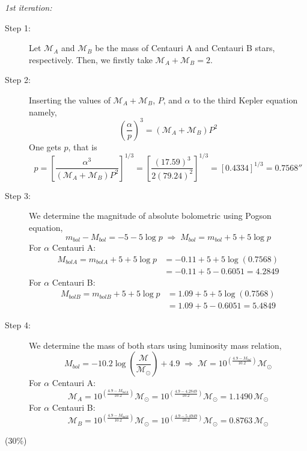 \begin{description}
  \emph{1st iteration:}
  \begin{description}
  \item[Step 1:] Let $\mathcal{M}_A$ and $\mathcal{M}_B$ be the mass of
    Centauri A and Centauri B stars, respectively. Then, we firstly take
    $\mathcal{M}_A + \mathcal{M}_B = 2$.
  \item[Step 2:] Inserting the values of $\mathcal{M}_A + \mathcal{M}_B$,
    $P$, and $\alpha$ to the third Kepler equation namely,
    \[ \left( \frac{\alpha}{p} \right)^3
       = (\mathcal{M}_A + \mathcal{M}_B) P^2 \]
    One gets $p$, that is
    \[ p = \left[ \frac{\alpha^3}{(\mathcal{M}_A + \mathcal{M}_B) P^2}
           \right]^{1/3}
         = \left[ \frac{(17.59)^3}{2 (79.24)^2} \right]^{1/3}
         = \left[ 0.4334 \right]^{1/3} = 0.7568'' \]
  \item[Step 3:] We determine the magnitude of absolute bolometric using
    Pogson equation,
    \[ m_{bol} - M_{bol} = -5 - 5\log p
       \;\Longrightarrow\; M_{bol} = m_{bol} + 5 + 5\log p \]
    For $\alpha$ Centauri A:
    \begin{align*}
      M_{bolA} = m_{bolA} + 5 + 5\log p &= -0.11 + 5 + 5\log(0.7568) \\
        &= -0.11 + 5 - 0.6051 = 4.2849
    \end{align*}
    For $\alpha$ Centauri B:
    \begin{align*}
      M_{bolB} = m_{bolB} + 5 + 5\log p &= 1.09 + 5 + 5\log(0.7568) \\
        &= 1.09 + 5 - 0.6051 = 5.4849
    \end{align*}
  \item[Step 4:] We determine the mass of both stars using luminosity mass
    relation,
    \[ M_{bol} = -10.2 \log\left( \frac{\mathcal{M}}{\mathcal{M}_\odot}
       \right) + 4.9
       \;\Longrightarrow\;
       \mathcal{M} = 10^{\left( \frac{4.9 - M_{bol}}{10.2} \right)}
       \mathcal{M}_\odot \]
    For $\alpha$ Centauri A:
    \[ \mathcal{M}_A = 10^{\left( \frac{4.9 - M_{bolA}}{10.2} \right)}
       \mathcal{M}_\odot
       = 10^{\left( \frac{4.9 - 4.2849}{10.2} \right)} \mathcal{M}_\odot
       = 1.1490\,\mathcal{M}_\odot \]
    For $\alpha$ Centauri B:
    \[ \mathcal{M}_B = 10^{\left( \frac{4.9 - M_{bolB}}{10.2} \right)}
       \mathcal{M}_\odot
       = 10^{\left( \frac{4.9 - 5.4949}{10.2} \right)} \mathcal{M}_\odot
       = 0.8763\,\mathcal{M}_\odot \]
  \end{description}
  \hfill(30\%)


\end{description}
